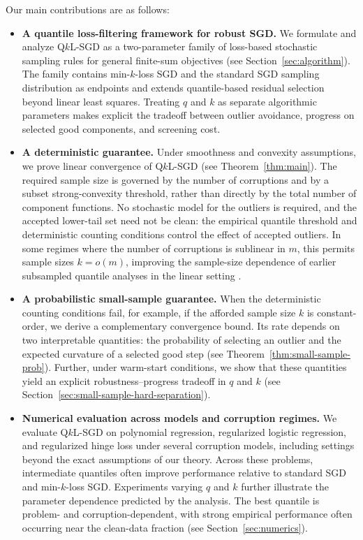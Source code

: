 \documentclass[11pt]{article}
\begin{document}
Our main contributions are as follows:
\begin{itemize}

\item \textbf{A quantile loss-filtering framework for robust SGD.}
We formulate and analyze Q\(k\)L-SGD as a two-parameter family of loss-based
stochastic sampling rules for general finite-sum objectives (see Section~\ref{sec:algorithm}). The family contains
min-\(k\)-loss SGD and the standard SGD sampling distribution as endpoints and
extends quantile-based residual selection beyond linear least squares. Treating
\(q\) and \(k\) as separate algorithmic parameters makes explicit the
tradeoff between outlier avoidance, progress on selected good components,
and screening cost.

\item \textbf{A deterministic guarantee.}
Under smoothness and convexity assumptions, we prove linear convergence of Q\(k\)L-SGD  (see Theorem~\ref{thm:main}). The required sample size
is governed by the number of corruptions and by a subset strong-convexity
threshold, rather than directly by the total number of component functions. No
stochastic model for the outliers is required, and the accepted lower-tail set
need not be clean: the empirical quantile threshold and deterministic counting
conditions control the effect of accepted outliers. In some regimes where the number of corruptions is
sublinear in \(m\), this permits sample sizes \(k=o(m)\), improving the
sample-size dependence of earlier subsampled quantile analyses in the linear
setting \citep{haddock2023subsampled}.

\item \textbf{A probabilistic small-sample guarantee.}
When the deterministic counting conditions fail, for example, if the afforded sample size $k$ is constant-order, we derive a complementary convergence bound. Its
rate depends on two interpretable quantities: the probability of
selecting an outlier and the expected curvature of a selected good step (see Theorem~\ref{thm:small-sample-prob}).
Further, under warm-start conditions, we show that these quantities yield an explicit robustness--progress
tradeoff in \(q\) and \(k\) (see Section~\ref{sec:small-sample-hard-separation}).

\item \textbf{Numerical evaluation across models and corruption regimes.}
We evaluate Q\(k\)L-SGD on polynomial regression, regularized logistic
regression, and regularized hinge loss under several corruption models,
including settings beyond the exact assumptions of our theory. Across these
problems, intermediate quantiles often improve performance relative to standard
SGD and min-\(k\)-loss SGD. Experiments varying \(q\) and \(k\) further
illustrate the parameter dependence predicted by the analysis. The best
quantile is problem- and corruption-dependent, with strong empirical performance
often occurring near the clean-data fraction (see Section~\ref{sec:numerics}).

\end{itemize}
\end{document}
